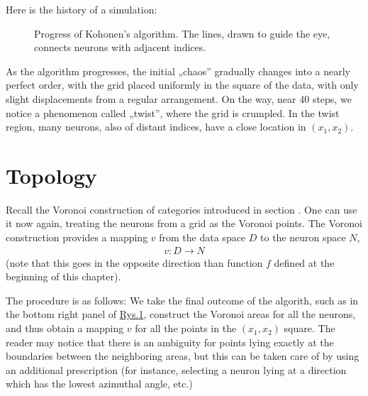 \documentclass[a4paper,12pt,polish]{jupyterBook}
\let\sphinxpxdimen\pdfpxdimen\else\newdimen\sphinxpxdimen
\begin{document}
\sphinxAtStartPar
Here is the history of a simulation:

\begin{figure}[htbp]
\centering
\capstart

\noindent\sphinxincludegraphics[width=800\sphinxpxdimen]{{kball}.png}
\caption{Progress of Kohonen’s algorithm. The lines, drawn to guide the eye, connects neurons with adjacent indices.}\label{\detokenize{docs/som:kohstory2-fig}}\end{figure}

\sphinxAtStartPar
As the algorithm progresses, the initial „chaos” gradually changes into a nearly perfect order, with the grid placed uniformly in the square of the data, with only slight displacements from a regular arrangement. On the way, near 40 steps, we notice a phenomenon called „twist”, where the grid is crumpled. In the twist region, many neurons, also of distant indices, have a close location in \((x_1,x_2)\).


\section{Topology}
\label{\detokenize{docs/som:topology}}
\sphinxAtStartPar
Recall the Voronoi construction of categories introduced in section {\hyperref[\detokenize{docs/unsupervised:vor-lab}]{}}. One can use it now again, treating the neurons from a grid as the Voronoi points. The Voronoi construction provides a mapping \(v\) from the data space \(D\) to the neuron space \(N\),
\begin{equation*}
\begin{split} 
v: D \to N 
\end{split}
\end{equation*}
\sphinxAtStartPar
(note that this goes in the opposite direction than function \(f\) defined at the beginning of this chapter).

\sphinxAtStartPar
The procedure is as follows:
We take the final outcome of the algorith, such as in the  bottom right panel of \hyperref[\detokenize{docs/som:kohstory2-fig}]{Rys.\@ \ref{\detokenize{docs/som:kohstory2-fig}}}, construct the Voronoi areas for all the neurons, and thus obtain a mapping \(v\) for all the points in the \((x_1,x_2)\) square. The reader may notice that there is an ambiguity for points lying exactly at the boundaries between the neighboring areas, but this can be taken care of by using an additional prescription (for instance, selecting a neuron lying at a direction which has the lowest azimuthal angle, etc.)
\end{document}
